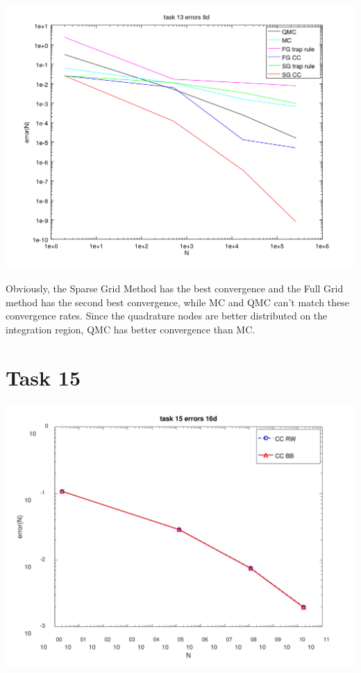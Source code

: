 \documentclass[10pt,a4paper]{article}
\begin{document}
\begin{center}
\includegraphics[scale=0.5]{task_13_d8.png}
\end{center}
Obviously, the Sparse Grid Method has the best convergence and the Full
Grid method has the second best convergence, while MC and QMC can't match
these convergence rates. Since the quadrature nodes are better distributed on
the integration region, QMC has better convergence than MC.

\section*{Task 15}
\begin{center}
\includegraphics[scale=0.29]{task15.png}
\end{center}
\end{document}
